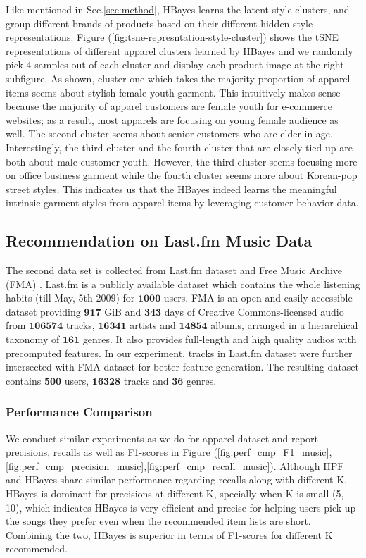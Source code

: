{Like mentioned in Sec.\ref{sec:method}, HBayes learns the latent style clusters, and group different brands of products based on their different hidden style representations.  Figure (\ref{fig:tsne-represntation-style-cluster}) shows the tSNE \cite{maaten2008visualizing} representations of different apparel clusters learned by HBayes and we randomly pick $4$ samples out of each cluster and display each product image at the right subfigure.  As shown, cluster one which takes the majority proportion of apparel items seems about stylish female youth garment.  This intuitively makes sense because the majority of apparel customers are female youth for e-commerce websites; as a result, most apparels are focusing on young female audience as well.    The second cluster seems about senior customers who are elder in age.   Interestingly, the third cluster and the fourth cluster that are closely tied up are both about male customer youth.  However, the third cluster seems focusing more on office business garment while the fourth cluster seems more about Korean-pop street styles.  This indicates us that the HBayes indeed learns the meaningful intrinsic garment styles from apparel items by leveraging customer behavior data.   

\subsection{Recommendation on Last.fm Music Data}
The second data set is collected from Last.fm dataset \cite{Celma:Springer2010} and Free Music Archive (FMA) \cite{FMA}. Last.fm is a publicly available dataset which contains the whole listening habits (till May, 5th 2009) for $\mathbf{1000}$ users. FMA is an open and easily accessible dataset providing $\mathbf{917}$ GiB and $\mathbf{343}$ days of Creative Commons-licensed audio from $\mathbf{106574}$ tracks, $\mathbf{16341}$ artists and $\mathbf{14854}$ albums, arranged in a hierarchical taxonomy of $\mathbf{161}$ genres. It also provides full-length and high quality audios with precomputed features.  In our experiment, tracks in Last.fm dataset were further intersected with FMA dataset for better feature generation.  The resulting dataset contains $\mathbf{500}$ users, $\mathbf{16328}$ tracks and $\mathbf{36}$ genres.

\subsubsection{Performance Comparison}
We conduct similar experiments as we do for apparel dataset and report precisions, recalls as well as F1-scores in Figure (\ref{fig:perf_cmp_F1_music},\ref{fig:perf_cmp_precision_music},\ref{fig:perf_cmp_recall_music}).  Although HPF and HBayes share similar performance regarding recalls along with different K, HBayes is dominant for precisions at different K, specially when K is small (5, 10), which indicates HBayes is very efficient and precise for helping users pick up the songs they prefer even when the recommended item lists are short.   Combining the two, HBayes is superior in terms of F1-scores for different K recommended.  

}
